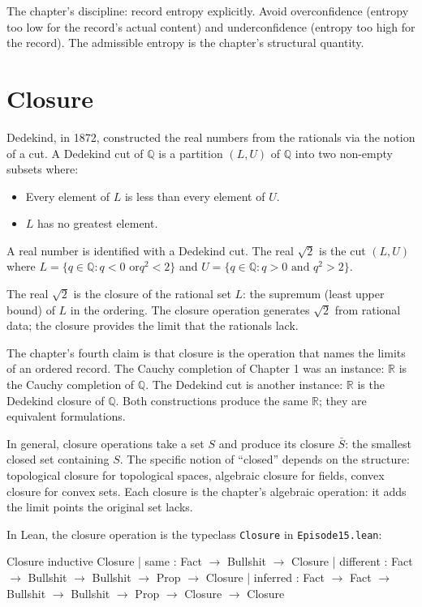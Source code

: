 The chapter's discipline: record entropy explicitly. Avoid
overconfidence (entropy too low for the record's actual content)
and underconfidence (entropy too high for the record). The
admissible entropy is the chapter's structural quantity.

\section{Closure}
\label{se:closure}

Dedekind, in 1872, constructed the real numbers from the rationals
via the notion of a cut. A Dedekind cut of $\mathbb{Q}$ is a
partition $(L, U)$ of $\mathbb{Q}$ into two non-empty subsets where:
\begin{itemize}
\item Every element of $L$ is less than every element of $U$.
\item $L$ has no greatest element.
\end{itemize}
A real number is identified with a Dedekind cut. The real $\sqrt{2}$
is the cut $(L, U)$ where $L = \{q \in \mathbb{Q} : q < 0 \text{ or
} q^2 < 2\}$ and $U = \{q \in \mathbb{Q} : q > 0 \text{ and } q^2 >
2\}$.

The real $\sqrt{2}$ is the closure of the rational set $L$: the
supremum (least upper bound) of $L$ in the ordering. The closure
operation generates $\sqrt{2}$ from rational data; the closure
provides the limit that the rationals lack.

The chapter's fourth claim is that closure is the operation that
names the limits of an ordered record. The Cauchy completion of
Chapter 1 was an instance: $\mathbb{R}$ is the Cauchy completion
of $\mathbb{Q}$. The Dedekind cut is another instance: $\mathbb{R}$
is the Dedekind closure of $\mathbb{Q}$. Both constructions
produce the same $\mathbb{R}$; they are equivalent formulations.

In general, closure operations take a set $S$ and produce its
closure $\bar{S}$: the smallest closed set containing $S$. The
specific notion of ``closed'' depends on the structure:
topological closure for topological spaces, algebraic closure for
fields, convex closure for convex sets. Each closure is the
chapter's algebraic operation: it adds the limit points the
original set lacks.

In Lean, the closure operation is the typeclass
\texttt{Closure} in \texttt{Episode15.lean}:

\begin{leanexcerpt}{Closure}
inductive Closure
  | same      : Fact $\to$ Bullshit $\to$ Closure
  | different : Fact $\to$ Bullshit $\to$ Bullshit $\to$ Prop $\to$ Closure
  | inferred  : Fact $\to$ Fact $\to$ Bullshit $\to$ Bullshit
              $\to$ Prop $\to$ Closure $\to$ Closure
\end{leanexcerpt}

